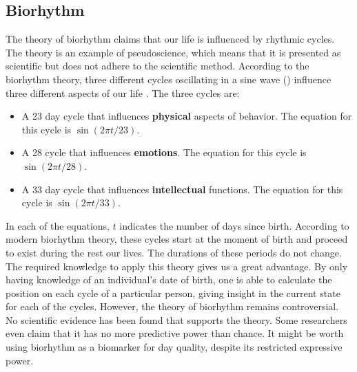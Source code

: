\subsection{Biorhythm}
The theory of biorhythm claims that our life is influenced by rhythmic cycles.
The theory is an example of pseudoscience, which means that it is presented as scientific but does not adhere to the scientific method.
According to the biorhythm theory, three different cycles oscillating in a sine wave () influence three different aspects of our life \cite{hines1998comprehensive}. 
The three cycles are:
%
\begin{itemize}
	\item A 23 day cycle that influences \textbf{physical} aspects of behavior. 
	The equation for this cycle is $\sin(2\pi t/23)$.
	
	\item A 28 cycle that influences \textbf{emotions}.
	The equation for this cycle is $\sin(2\pi t/28)$.
	
	\item A 33 day cycle that influences \textbf{intellectual} functions. 
	The equation for this cycle is $\sin(2\pi t/33)$.
\end{itemize}
%
\begin{figure}
	\centering
		\label{fig:biocycles}
\end{figure}
%
In each of the equations, $t$ indicates the number of days since birth.
According to modern biorhythm theory, these cycles start at the moment of birth and proceed to exist during the rest our lives. 
The durations of these periods do not change.
The required knowledge to apply this theory gives us a great advantage.
By only having knowledge of an individual's date of birth, one is able to calculate the position on each cycle of a particular person, giving insight in the current state for each of the cycles. However, the theory of biorhythm remains controversial.
No scientific evidence has been found that supports the theory.
Some researchers even claim that it has no more predictive power than chance.
It might be worth using biorhythm as a biomarker for day quality, despite its restricted expressive power.

